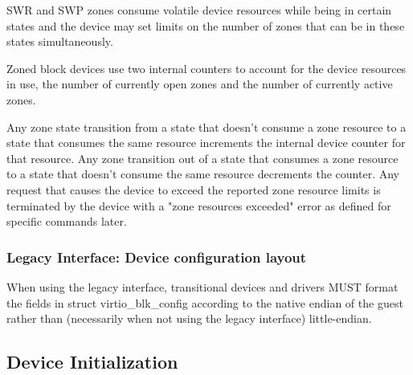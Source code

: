 SWR and SWP zones consume volatile device resources while being in certain
states and the device may set limits on the number of zones that can be in these
states simultaneously.

Zoned block devices use two internal counters to account for the device
resources in use, the number of currently open zones and the number of currently
active zones.

Any zone state transition from a state that doesn't consume a zone resource to a
state that consumes the same resource increments the internal device counter for
that resource. Any zone transition out of a state that consumes a zone resource
to a state that doesn't consume the same resource decrements the counter. Any
request that causes the device to exceed the reported zone resource limits is
terminated by the device with a "zone resources exceeded" error as defined for
specific commands later.

\subsubsection{Legacy Interface: Device configuration layout}\label{sec:Device Types / Block Device / Device configuration layout / Legacy Interface: Device configuration layout}
When using the legacy interface, transitional devices and drivers
MUST format the fields in struct virtio_blk_config
according to the native endian of the guest rather than
(necessarily when not using the legacy interface) little-endian.


\subsection{Device Initialization}\label{sec:Device Types / Block Device / Device Initialization}

